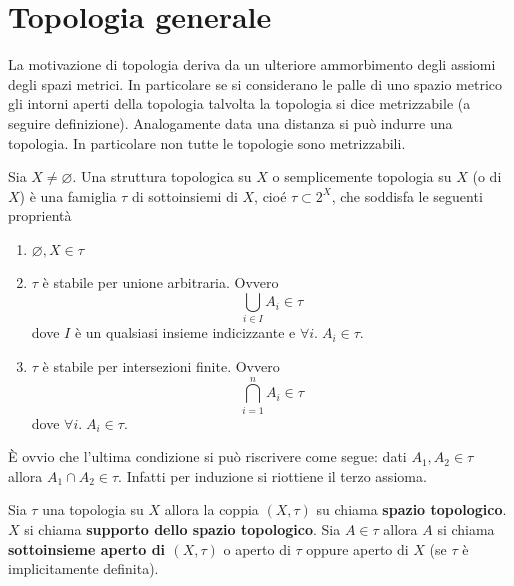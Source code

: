 \chapter{Topologia generale}

La motivazione di topologia deriva da un ulteriore ammorbimento degli assiomi degli spazi metrici. In particolare se si considerano le palle di uno spazio metrico gli intorni aperti della topologia talvolta la topologia si dice metrizzabile (a seguire definizione). Analogamente data una distanza si può indurre una topologia. In particolare non tutte le topologie sono metrizzabili. 

\begin{definition}
	Sia $X \neq \varnothing$. Una struttura topologica su $X$ o semplicemente topologia su $X$ (o di $X$) è una famiglia $\tau$ di sottoinsiemi di $X$, cioé $\tau \subset 2^X$, che soddisfa le seguenti proprientà
	\begin{enumerate}
		\item $\varnothing, X \in \tau$
		\item $\tau$ è stabile per unione arbitraria. Ovvero 
		\begin{equation*}
			\bigcup_{i \in I} A_i \in \tau 	
		\end{equation*}
		dove $I$ è un qualsiasi insieme indicizzante e $\forall i. \; A_i \in \tau$.
		\item $\tau$ è stabile per intersezioni finite. Ovvero 
		\begin{equation*}
			\bigcap^n_{i=1} A_i \in \tau
		\end{equation*}
		dove $\forall i. \; A_i \in \tau$.
	\end{enumerate} 
\end{definition}

\begin{remark}
	È ovvio che l'ultima condizione si può riscrivere come segue: dati $A_1, A_2 \in \tau$ allora $A_1 \cap A_2 \in \tau$. Infatti per induzione si riottiene il terzo assioma. 
\end{remark}

\begin{definition}
	Sia $\tau$ una topologia su $X$ allora la coppia $(X, \tau)$ su chiama \textbf{spazio topologico}. $X$ si chiama \textbf{supporto dello spazio topologico}. Sia $A \in \tau$ allora $A$ si chiama \textbf{sottoinsieme aperto di $(X,\tau)$} o aperto di $\tau$ oppure aperto di $X$ (se $\tau$ è implicitamente definita). 	
\end{definition}

